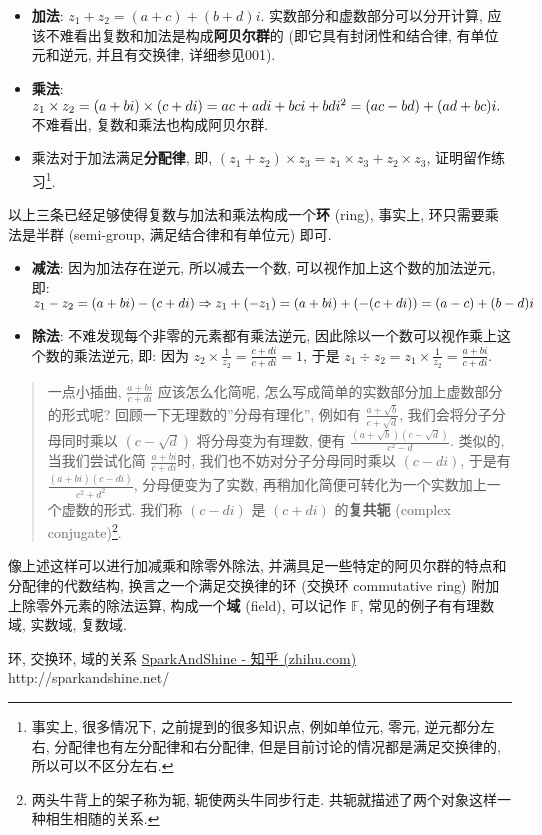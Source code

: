 \begin{itemize}
\tightlist
\item
  \textbf{加法}: \(z_1+z_2=(a+c)+(b+d)i\).
  实数部分和虚数部分可以分开计算,
  应该不难看出复数和加法是构成\textbf{阿贝尔群}的
  (即它具有封闭性和结合律, 有单位元和逆元, 并且有交换律, 详细参见001).
\item
  \textbf{乘法}:
  \(z_1\times z_2=(a+bi)\times(c+di)\\=ac+adi+bci+bdi^2=(ac-bd)+(ad+bc)i.\)
  不难看出, 复数和乘法也构成阿贝尔群.
\item
  乘法对于加法满足\textbf{分配律}, 即,
  \((z_1+z_2)\times z_3=z_1\times z_3+z_2\times z_3\),
  证明留作练习\footnote{事实上, 很多情况下, 之前提到的很多知识点,
    例如单位元, 零元, 逆元都分左右, 分配律也有左分配律和右分配律,
    但是目前讨论的情况都是满足交换律的, 所以可以不区分左右.}.
\end{itemize}

以上三条已经足够使得复数与加法和乘法构成一个\textbf{环} (ring), 事实上,
环只需要乘法是半群 (semi-group, 满足结合律和有单位元) 即可.

\begin{itemize}
\tightlist
\item
  \textbf{减法}: 因为加法存在逆元, 所以减去一个数,
  可以视作加上这个数的加法逆元, 即:
  \(z_1-z_2=(a+bi)-(c+di)\\\Rightarrow z_1+(-z_1)=(a+bi)+(-(c+di))=(a-c)+(b-d)i\)
\item
  \textbf{除法}: 不难发现每个非零的元素都有乘法逆元,
  因此除以一个数可以视作乘上这个数的乘法逆元, 即: 因为
  \(z_2\times\frac{1}{z_2}=\frac{c+di}{c+di}=1\), 于是
  \(z_1\div z_2=z_1\times\frac{1}{z_2}=\frac{a+bi}{c+di}\).
\end{itemize}

\begin{quote}
一点小插曲, \(\frac{a+bi}{c+di}\) 应该怎么化简呢,
怎么写成简单的实数部分加上虚数部分的形式呢?
回顾一下无理数的''分母有理化'', 例如有
\(\frac{a+\sqrt{b}}{c+\sqrt{d}}\), 我们会将分子分母同时乘以
\((c-\sqrt{d})\) 将分母变为有理数, 便有
\(\frac{(a+\sqrt{b})(c-\sqrt{d})}{c^2-d}\). 类似的, 当我们尝试化简
\(\frac{a+bi}{c+di}\)时, 我们也不妨对分子分母同时乘以 \((c-di)\), 于是有
\(\frac{(a+bi)(c-di)}{c^2+d^2}\), 分母便变为了实数,
再稍加化简便可转化为一个实数加上一个虚数的形式. 我们称 \((c-di)\) 是
\((c+di)\) 的\textbf{复共轭} (complex conjugate)\footnote{两头牛背上的架子称为轭,
  轭使两头牛同步行走. 共轭就描述了两个对象这样一种相生相随的关系.}.
\end{quote}

像上述这样可以进行加减乘和除零外除法,
并满具足一些特定的阿贝尔群的特点和分配律的代数结构,
换言之一个满足交换律的环 (交换环 commutative ring)
附加上除零外元素的除法运算, 构成一个\textbf{域} (field), 可以记作
\(\mathbb{F}\), 常见的例子有有理数域, 实数域, 复数域.

环, 交换环, 域的关系
\href{https://www.zhihu.com/people/SparkandShine}{SparkAndShine - 知乎
(zhihu.com)} http://sparkandshine.net/
